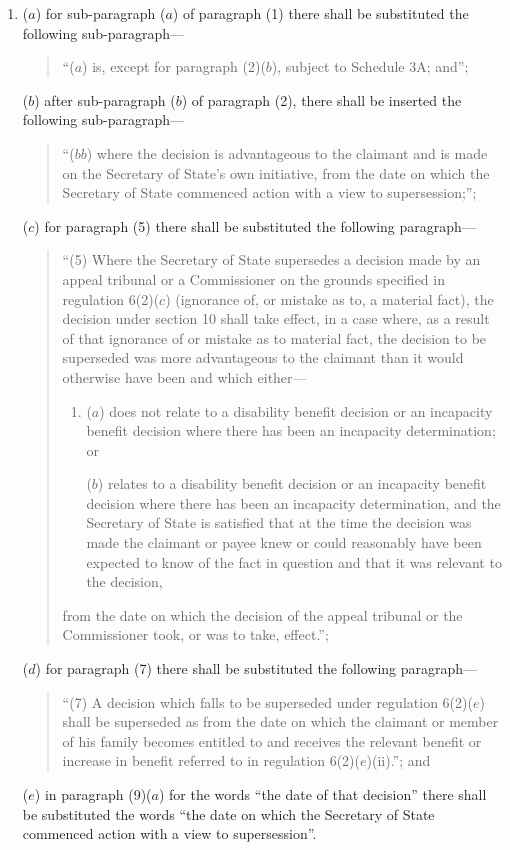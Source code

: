 \documentclass[12pt,a4paper]{article}
\begin{document}
\begin{enumerate}\item[]
($a$) for sub-paragraph ($a$)  of paragraph (1) there shall be substituted the following sub-paragraph—
\begin{quotation}
“($a$) is, except for paragraph (2)($b$), subject to Schedule 3A; and”;
\end{quotation}

($b$) after sub-paragraph ($b$)  of paragraph (2), there shall be inserted the following sub-paragraph—
\begin{quotation}
“($bb$) where the decision is advantageous to the claimant and is made on the Secretary of State’s own initiative, from the date on which the Secretary of State commenced action with a view to supersession;”;
\end{quotation}

($c$) for paragraph (5) there shall be substituted the following paragraph—
\begin{quotation}
“(5) Where the Secretary of State supersedes a decision made by an appeal tribunal or a Commissioner on the grounds specified in regulation 6(2)($c$)  (ignorance of, or mistake as to, a material fact), the decision under section 10 shall take effect, in a case where, as a result of that ignorance of or mistake as to material fact, the decision to be superseded was more advantageous to the claimant than it would otherwise have been and which either—
\begin{enumerate}\item[]
($a$) does not relate to a disability benefit decision or an incapacity benefit decision where there has been an incapacity determination; or

($b$) relates to a disability benefit decision or an incapacity benefit decision where there has been an incapacity determination, and the Secretary of State is satisfied that at the time the decision was made the claimant or payee knew or could reasonably have been expected to know of the fact in question and that it was relevant to the decision,
\end{enumerate}
from the date on which the decision of the appeal tribunal or the Commissioner took, or was to take, effect.”;
\end{quotation}

($d$) for paragraph (7) there shall be substituted the following paragraph—
\begin{quotation}
“(7) A decision which falls to be superseded under regulation 6(2)($e$)  shall be superseded as from the date on which the claimant or member of his family becomes entitled to and receives the relevant benefit or increase in benefit referred to in regulation 6(2)($e$)(ii).”; and
\end{quotation}

($e$) in paragraph (9)($a$)  for the words “the date of that decision” there shall be substituted the words “the date on which the Secretary of State commenced action with a view to supersession”.
\end{enumerate}
\end{document}

